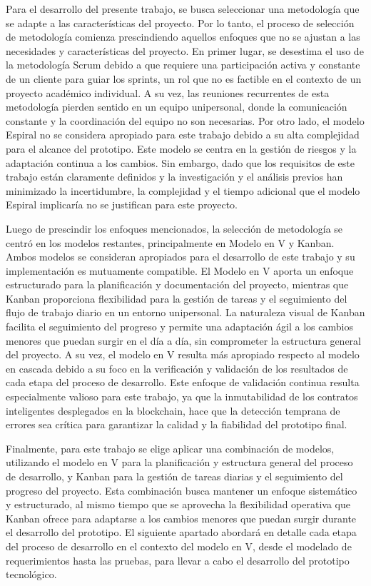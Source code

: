 Para el desarrollo del presente trabajo, se busca seleccionar una metodología que se adapte a las características del proyecto. Por lo tanto, el proceso de selección de metodología comienza prescindiendo aquellos enfoques que no se ajustan a las necesidades y características del proyecto. En primer lugar, se desestima el uso de la metodología Scrum debido a que requiere una participación activa y constante de un cliente para guiar los sprints, un rol que no es factible en el contexto de un proyecto académico individual. A su vez, las reuniones recurrentes de esta metodología pierden sentido en un equipo unipersonal, donde la comunicación constante y la coordinación del equipo no son necesarias. Por otro lado, el modelo Espiral no se considera apropiado para este trabajo debido a su alta complejidad para el alcance del prototipo. Este modelo se centra en la gestión de riesgos y la adaptación continua a los cambios. Sin embargo, dado que los requisitos de este trabajo están claramente definidos y la investigación y el análisis previos han minimizado la incertidumbre, la complejidad y el tiempo adicional que el modelo Espiral implicaría no se justifican para este proyecto.

Luego de prescindir los enfoques mencionados, la selección de metodología se centró en los modelos restantes, principalmente en Modelo en V y Kanban. Ambos modelos se consideran apropiados para el desarrollo de este trabajo y su implementación es mutuamente compatible. El Modelo en V aporta un enfoque estructurado para la planificación y documentación del proyecto, mientras que Kanban proporciona flexibilidad para la gestión de tareas y el seguimiento del flujo de trabajo diario en un entorno unipersonal. La naturaleza visual de Kanban facilita el seguimiento del progreso y permite una adaptación ágil a los cambios menores que puedan surgir en el día a día, sin comprometer la estructura general del proyecto. A su vez, el modelo en V resulta más apropiado respecto al modelo en cascada debido a su foco en la verificación y validación de los resultados de cada etapa del proceso de desarrollo. Este enfoque de validación continua resulta especialmente valioso para este trabajo, ya que la inmutabilidad de los contratos inteligentes desplegados en la blockchain, hace que la detección temprana de errores sea crítica para garantizar la calidad y la fiabilidad del prototipo final. 

Finalmente, para este trabajo se elige aplicar una combinación de modelos, utilizando el modelo en V para la planificación y estructura general del proceso de desarrollo, y Kanban para la gestión de tareas diarias y el seguimiento del progreso del proyecto. Esta combinación busca mantener un enfoque sistemático y estructurado, al mismo tiempo que se aprovecha la flexibilidad operativa que Kanban ofrece para adaptarse a los cambios menores que puedan surgir durante el desarrollo del prototipo. El siguiente apartado abordará en detalle cada etapa del proceso de desarrollo en el contexto del modelo en V, desde el modelado de requerimientos hasta las pruebas, para llevar a cabo el desarrollo del prototipo tecnológico.

